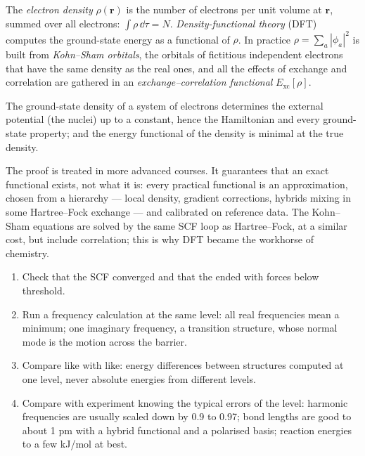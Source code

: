 \begin{definition}\label{def:b3:computational-chemistry:dft}
The \emph{electron density} $\rho(\mathbf r)$ is the
number of electrons per unit volume at $\mathbf r$, summed over all electrons:
$\int\rho\,\dd\tau = N$. \emph{Density-functional theory} (DFT) computes the ground-state energy as a functional of $\rho$. In
practice $\rho = \sum_a|\phi_a|^2$ is built from \emph{Kohn--Sham
orbitals}, the orbitals of fictitious independent
electrons that have the same density as the real ones, and all the effects
of exchange and correlation are gathered in an \emph{exchange--correlation
functional} $E_{\mathrm{xc}}[\rho]$.
\end{definition}

\begin{theorem}\label{thm:b3:computational-chemistry:hohenberg-kohn}
The ground-state density of a system of electrons determines the external
potential (the nuclei) up to a constant, hence the Hamiltonian and every
ground-state property; and the energy functional of the density is
minimal at the true density.
\end{theorem}
\admitted

The proof is treated in more advanced courses. It guarantees that an exact
functional exists, not what it is: every practical functional is an
approximation, chosen from a hierarchy --- local density, gradient
corrections, hybrids mixing in some Hartree--Fock exchange --- and
calibrated on reference data. The Kohn--Sham equations are solved by the
same SCF loop as Hartree--Fock, at a similar cost, but include correlation;
this is why DFT became the workhorse of chemistry.

\begin{method}\label{met:b3:computational-chemistry:read-calculation}
\begin{enumerate}
  \item Check that the SCF converged and that the  ended
        with forces below threshold.
  \item Run a frequency calculation at the same level: all real frequencies
        mean a minimum; one imaginary frequency, a transition structure, whose
        normal mode is the motion across the barrier.
  \item Compare like with like: energy differences between structures
        computed at one level, never absolute energies from different levels.
  \item Compare with experiment knowing the typical errors of the level:
        harmonic frequencies are usually scaled down by 0.9 to 0.97;
        bond lengths are good to about 1 pm with a hybrid functional and a
        polarised basis; reaction energies to a few \unit{kJ/mol} at best.
\end{enumerate}
\end{method}

